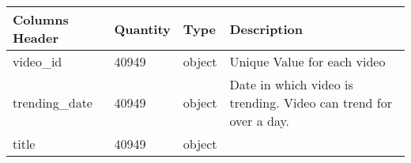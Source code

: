 \documentclass[11pt]{article}
\begin{document}
    \begin{longtable}[]{@{}llll@{}}
\toprule
\begin{minipage}[b]{0.32\columnwidth}\raggedright
Columns Header\strut
\end{minipage} & \begin{minipage}[b]{0.18\columnwidth}\raggedright
Quantity\strut
\end{minipage} & \begin{minipage}[b]{0.14\columnwidth}\raggedright
Type\strut
\end{minipage} & \begin{minipage}[b]{0.25\columnwidth}\raggedright
Description\strut
\end{minipage}\tabularnewline
\midrule
\endhead
\begin{minipage}[t]{0.32\columnwidth}\raggedright
video\_id\strut
\end{minipage} & \begin{minipage}[t]{0.18\columnwidth}\raggedright
40949\strut
\end{minipage} & \begin{minipage}[t]{0.14\columnwidth}\raggedright
object\strut
\end{minipage} & \begin{minipage}[t]{0.25\columnwidth}\raggedright
Unique Value for each video\strut
\end{minipage}\tabularnewline
\begin{minipage}[t]{0.32\columnwidth}\raggedright
trending\_date\strut
\end{minipage} & \begin{minipage}[t]{0.18\columnwidth}\raggedright
40949\strut
\end{minipage} & \begin{minipage}[t]{0.14\columnwidth}\raggedright
object\strut
\end{minipage} & \begin{minipage}[t]{0.25\columnwidth}\raggedright
Date in which video is trending. Video can trend for over a day.\strut
\end{minipage}\tabularnewline
\begin{minipage}[t]{0.32\columnwidth}\raggedright
title\strut
\end{minipage} & \begin{minipage}[t]{0.18\columnwidth}\raggedright
40949\strut
\end{minipage} & \begin{minipage}[t]{0.14\columnwidth}\raggedright
object\strut
\end{minipage} & \begin{minipage}[t]{0.25\columnwidth}\raggedright

\end{minipage}
\end{longtable}
\end{document}
